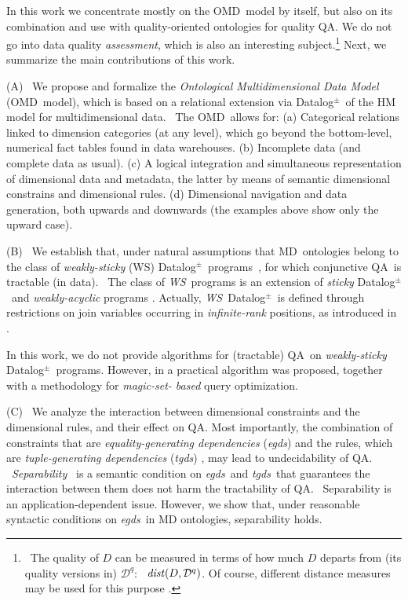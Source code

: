 \documentclass[format=acmsmall, review=false, screen=true]{acmart}
\newcommand{\mc}[1]{\mathcal{ #1}}
\newcommand{\nit}[1]{{\it #1}}
\newcommand{\dpm}{{Datalog}$^\pm$}
\newcommand{\m}{\;\!\!}
\newcommand{\WS}{{\em W\m{}S}}
\newcommand{\qa}{QA}
\newcommand{\omd}{OMD}
\newcommand{\md}{MD}
\newcommand{\egds}{{\em egds}}
\newcommand{\tgds}{{\em tgds}}
\begin{document}
In this work we concentrate mostly on the \omd \ model by itself, but also on its combination and use with quality-oriented ontologies for quality QA. We do not go into data quality {\em assessment}, which is also an interesting subject.\footnote{\ The quality of $D$ can be measured in terms of how much $D$ departs from (its quality versions in) $\mc{D}^q$: \ $\nit{dist}(D,\mc{D}^q)$. Of course, different distance measures may be used for this purpose \cite{bertossi-brite,bertossi16}.} Next, we summarize the main contributions of this work.

\vspace{2mm}

\noindent (A) \ We propose and formalize the {\em Ontological Multidimensional Data Model} (\omd \ model), which is based on a relational extension via \dpm \ of the HM model for multidimensional data. \
The \omd \ allows for: (a) Categorical relations linked to dimension categories (at any level), which go beyond the bottom-level, numerical fact tables found in data warehouses. (b) Incomplete data (and complete data as usual). (c) A logical integration and simultaneous representation of dimensional data and metadata, the latter by means of semantic dimensional constrains and dimensional rules. (d) Dimensional navigation and data generation, both upwards and downwards (the examples above show only the upward case).

\vspace{1mm}
\noindent (B) \ We establish that, under natural assumptions that  \md \ ontologies belong to the class of {\em weakly-sticky}  (WS) \dpm \ programs~\cite{cali12}, for which conjunctive \qa \ is tractable (in data).
\
The class of \WS \ programs is an extension of {\em sticky} \dpm \cite{cali12} \ and {\em weakly-acyclic} programs \cite{fagin}. Actually, \WS \  \dpm \ is defined through restrictions on join variables occurring in {\em infinite-rank} positions, as introduced in \cite{fagin}.

In this work, we do not provide algorithms for (tractable) \qa \ on {\em weakly-sticky} \dpm \ programs. However, in \cite{milani16rr} a practical algorithm was proposed, together with a methodology for {\em magic-set- based} query optimization.

\vspace{1mm}
\noindent (C) \ We analyze the interaction between dimensional constraints and the dimensional rules, and their effect on \qa. Most importantly, the combination of constraints that are {\em equality-generating dependencies} (\egds) and the rules, which are {\em tuple-generating dependencies} (\tgds) \cite{cali03}, may lead to undecidability of QA. \ {\em Separability}~\cite{cali12} is a semantic condition on \egds \ and \tgds \ that guarantees the interaction between them does not harm the tractability of QA. \
    Separability is an application-dependent issue. However, we show that, under reasonable syntactic conditions on \egds \ in MD ontologies,  separability holds.
\end{document}
